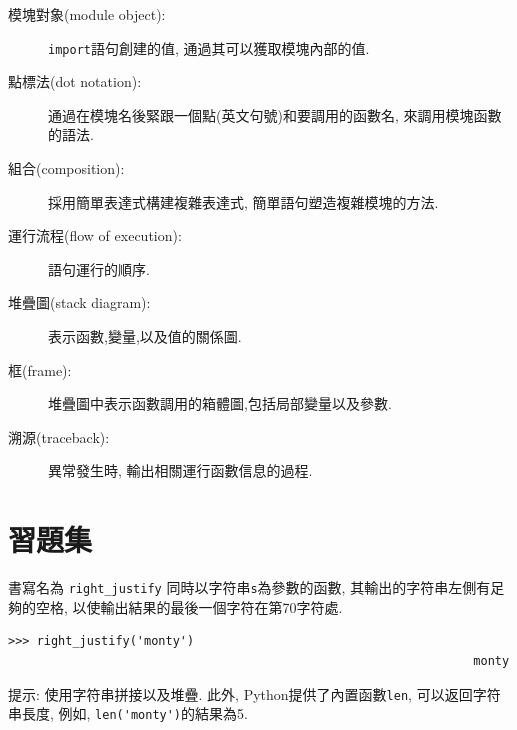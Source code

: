 \documentclass[10pt]{book}
\begin{document}
\begin{description}
\item[模塊對象(module object):]  {\tt import}語句創建的值, 通過其可以獲取模塊內部的值. 

\item[點標法(dot notation):]  通過在模塊名後緊跟一個點(英文句號)和要調用的函數名, 
來調用模塊函數的語法. 

\item[組合(composition):] 採用簡單表達式構建複雜表達式, 簡單語句塑造複雜模塊的方法. 

\item[運行流程(flow of execution):] 語句運行的順序.

\item[堆疊圖(stack diagram):]  表示函數,變量,以及值的關係圖. 

\item[框(frame):]  堆疊圖中表示函數調用的箱體圖,包括局部變量以及參數. 

\item[溯源(traceback):] 異常發生時, 輸出相關運行函數信息的過程. 


\end{description}


\section{習題集}

\begin{exercise}

書寫名為 \verb"right_justify" 同時以字符串{\tt s}為參數的函數, 
其輸出的字符串左側有足夠的空格, 以使輸出結果的最後一個字符在第70字符處. 

\begin{verbatim}
>>> right_justify('monty')
                                                                 monty
\end{verbatim}

提示: 使用字符串拼接以及堆疊. 此外, Python提供了內置函數{\tt len}, 可以返回字符串長度, 
例如, \verb"len('monty')"的結果為5.

\end{exercise}
\end{document}
